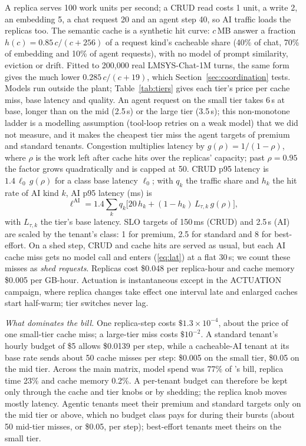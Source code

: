 A replica serves 100 work units per second; a CRUD read costs 1 unit, a
write 2, an embedding 5, a chat request 20 and an agent step 40, so AI
traffic loads the replicas too. The semantic cache is a synthetic hit
curve: $c$\,MB answer a fraction $h(c)=0.85\,c/(c+256)$ of a request kind's
cacheable share (40\% of chat, 70\% of embedding and 10\% of agent
requests), with no model of prompt similarity, eviction or drift. Fitted to
200{,}000 real LMSYS-Chat-1M turns, the same form gives the much lower
$0.285\,c/(c+19)$, which Section~\ref{sec:coordination} tests. Models run
outside the plant; Table~\ref{tab:tiers} gives each tier's price per cache
miss, base latency and quality. An agent request on the small tier takes
6\,s at base, longer than on the mid (2.5\,s) or the large tier (3.5\,s);
this non-monotone ladder is a modelling assumption (tool-loop retries on a
weak model) that we did not measure, and it makes the cheapest tier miss
the agent targets of premium and standard tenants.
Congestion multiplies latency by $g(\rho)=1/(1-\rho)$, where $\rho$ is the
work left after cache hits over the replicas' capacity; past $\rho=0.95$ the
factor grows quadratically and is capped at 50. CRUD p95 latency is
$1.4\,\ell_0\,g(\rho)$ for a class base latency $\ell_0$; with $q_k$ the
traffic share and $h_k$ the hit rate of AI kind $k$, AI p95 latency (ms) is
\begin{equation}
\label{eq:lat}
\ell^{\mathrm{AI}}=1.4\sum_k q_k\bigl[20\,h_k+(1-h_k)\,L_{\tau,k}\,g(\rho)\bigr],
\end{equation}
with $L_{\tau,k}$ the tier's base latency. SLO targets of 150\,ms (CRUD) and
2.5\,s (AI) are scaled by the tenant's class: 1 for premium, 2.5 for
standard and 8 for best-effort. On a shed step, CRUD and cache hits are
served as usual, but each AI cache miss gets no model call and enters
(\ref{eq:lat}) at a flat 30\,s; we count these misses as \emph{shed
requests}. Replicas cost \$0.048 per replica-hour and cache memory \$0.005
per GB-hour. Actuation is instantaneous except in the ACTUATION campaign,
where replica changes take effect one interval late and enlarged caches
start half-warm; tier switches never lag.

\emph{What dominates the bill.} One replica-step costs
$\$1.3\times10^{-4}$, about the price of one small-tier cache miss; a
large-tier miss costs $\$10^{-2}$. A standard tenant's hourly budget of \$5
allows \$0.0139 per step, while a cacheable-AI tenant at its base rate sends
about 50 cache misses per step: \$0.005 on the small tier, \$0.05 on the
mid tier. Across the main matrix, model spend was 77\% of \jcac{}'s bill,
replica time 23\% and cache memory 0.2\%. A per-tenant budget can therefore
be kept only through the cache and tier knobs or by shedding; the replica
knob moves mostly latency. Agentic tenants meet their premium and standard
targets only on the mid tier or above, which no budget class pays for during
their bursts (about 50 mid-tier misses, or \$0.05, per step); best-effort
tenants meet theirs on the small tier.

